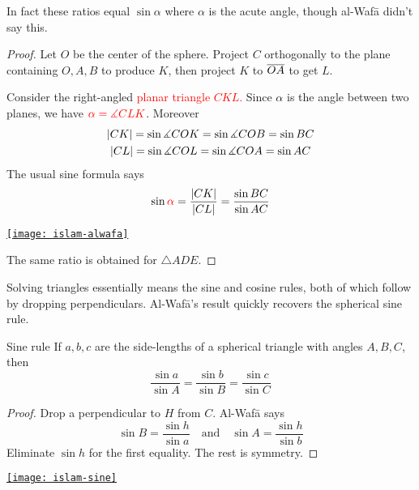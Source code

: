 In fact these ratios equal $\sin\alpha$ where $\alpha$ is the acute angle, though al-Wafā didn't say this.

\begin{proof}
Let $O$ be the center of the sphere. Project $C$ orthogonally to the plane containing $O,A,B$ to produce $K$, then project $K$ to $\overline{OA}$ to get $L$.\par
\begin{minipage}[t]{0.55\linewidth}\vspace{-5pt}
Consider the right-angled \textcolor{red}{planar triangle $CKL$.} Since $\alpha$ is the angle between two planes, we have $\textcolor{red}{\alpha=\measuredangle CLK}$. Moreover
\begin{gather*}
\left| CK\right|=\sin\measuredangle COK=\sin\measuredangle COB=\sin BC\\
\left| CL\right|=\sin\measuredangle COL=\sin\measuredangle COA=\sin AC
\end{gather*}
The usual sine formula says
\[\sin\textcolor{red}{\alpha}=\frac{\left| CK\right|}{\left| CL\right|}=\frac{\sin BC}{\sin AC}\]
\end{minipage}\hfill\begin{minipage}[t]{0.4\linewidth}\vspace{-15pt}
\flushright\href{http://math.uci.edu/~ndonalds/math184/islam-alwafa.html}{\texttt{[image: islam-alwafa]}}
\end{minipage}\par\vspace{-3pt}
The same ratio is obtained for $\triangle ADE$.
\end{proof}

\goodbreak

Solving triangles essentially means the sine and cosine rules, both of which follow by dropping perpendiculars. Al-Wafā's result quickly recovers the spherical sine rule.

\begin{minipage}[t]{0.65\linewidth}\vspace{0pt}
\begin{cor*}{Sine rule}{}
If $a,b,c$ are the side-lengths of a spherical triangle with angles $A,B,C$, then
\[\frac{\sin a}{\sin A}=\frac{\sin b}{\sin B}=\frac{\sin c}{\sin C}\]
\end{cor*}

\begin{proof}
Drop a perpendicular to $H$ from $C$. Al-Wafā says
\[\sin B=\frac{\sin h}{\sin a}\quad\text{and}\quad \sin A=\frac{\sin h}{\sin b}\]
Eliminate $\sin h$ for the first equality. The rest is symmetry.
\end{proof}
\end{minipage}\hfill\begin{minipage}[t]{0.34\linewidth}\vspace{0pt}
\flushright\href{http://math.uci.edu/~ndonalds/math184/islam-sine.html}{\texttt{[image: islam-sine]}}
\end{minipage}
\medbreak


